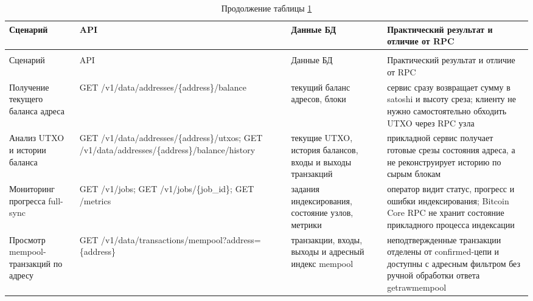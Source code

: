 \begin{scriptsize}
\setlength{\tabcolsep}{2pt}
\begin{longtable}{|p{}|p{}|p{}|p{}|}
    \caption{Практические сценарии применения системы}\label{tab:practical-scenarios}\\ \hline
    Сценарий & API & Данные БД & Практический результат и отличие от RPC \\ \hline
    \endfirsthead
    \caption*{Продолжение таблицы \ref{tab:practical-scenarios}}\\ \hline
    Сценарий & API & Данные БД & Практический результат и отличие от RPC \\ \hline
    \endhead
    \hline
    \endfoot
    \hline
    \endlastfoot
    Получение текущего баланса адреса &
    GET /v1/data/addresses/\newline\{address\}/balance &
    текущий баланс адресов, блоки &
    сервис сразу возвращает сумму в satoshi и высоту среза; клиенту не нужно
    самостоятельно обходить UTXO через RPC узла \\ \hline
    Анализ UTXO и истории баланса &
    GET /v1/data/addresses/\newline\{address\}/utxos;\newline
    GET /v1/data/addresses/\newline\{address\}/balance/history &
    текущие UTXO, история балансов, входы и выходы транзакций &
    прикладной сервис получает готовые срезы состояния адреса, а не
    реконструирует историю по сырым блокам \\ \hline
    Мониторинг прогресса full-sync &
    GET /v1/jobs;\newline
    GET /v1/jobs/\newline\{job\_id\};\newline
    GET /metrics &
    задания индексирования, состояние узлов, метрики &
    оператор видит статус, прогресс и ошибки индексирования; Bitcoin Core RPC
    не хранит состояние прикладного процесса индексации \\ \hline
    Просмотр mempool-транзакций по адресу &
    GET /v1/data/transactions/\newline mempool?address=\{address\} &
    транзакции, входы, выходы и адресный индекс mempool &
    неподтвержденные транзакции отделены от confirmed-цепи и доступны с
    адресным фильтром без ручной обработки ответа getrawmempool \\ \hline
\end{longtable}
\end{scriptsize}

